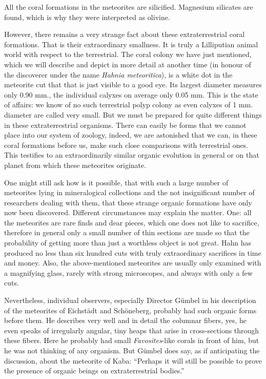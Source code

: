 \documentclass[a4paper, 12pt, oneside]{article}
\begin{document}
All the coral formations in the meteorites are silicified. Magnesium silicates are found, which is why they were interpreted as olivine.

However, there remains a very strange fact about these extraterrestrial coral formations. That is their extraordinary smallness. It is truly a Lilliputian animal world with respect to the terrestrial. The coral colony we have just mentioned, which we will describe and depict in more detail at another time (in honour of the discoverer under the name \emph{Hahnia meteoritica}), is a white dot in the meteorite cut that that is just visible to a good eye. Its largest diameter measures only 0.90 mm., the individual calyxes on average only 0.05 mm. This is the state of affairs: we know of no such terrestrial polyp colony as even calyxes of 1 mm. diameter are called very small. But we must be prepared for quite different things in these extraterrestrial organisms. There can easily be forms that we cannot place into our system of zoology, indeed, we are astonished that we can, in these coral formations before us, make such close comparisons with terrestrial ones. This testifies to an extraordinarily similar organic evolution in general or on that planet from which these meteorites originate.

One might still ask how is it possible, that with such a large number of meteorites lying in mineralogical collections and the not insignificant number of researchers dealing with them, that these strange organic formations have only now been discovered. Different circumstances may explain the matter. One: all the meteorites are rare finds and dear pieces, which one does not like to sacrifice, therefore in general only a small number of thin sections are made so that the probability of getting more than just a worthless object is not great. Hahn has produced no less than six hundred cuts with truly extraordinary sacrifices in time and money. Also, the above-mentioned meteorites are usually only examined with a magnifying glass, rarely with strong microscopes, and always with only a few cuts.

Nevertheless, individual observers, especially Director Gümbel in his description of the meteorites of Eichstädt and Schöneberg, probably had such organic forms before them. He describes very well and in detail the columnar fibers, yes, he even speaks of irregularly angular, tiny heaps that arise in cross-sections through these fibers. Here he probably had small \emph{Favosites}-like corals in front of him, but he was not thinking of any organism. But Gümbel does say, as if anticipating the discussion, about the meteorite of Kaba: ``Perhaps it will still be possible to prove the presence of organic beings on extraterrestrial bodies.''
\end{document}
